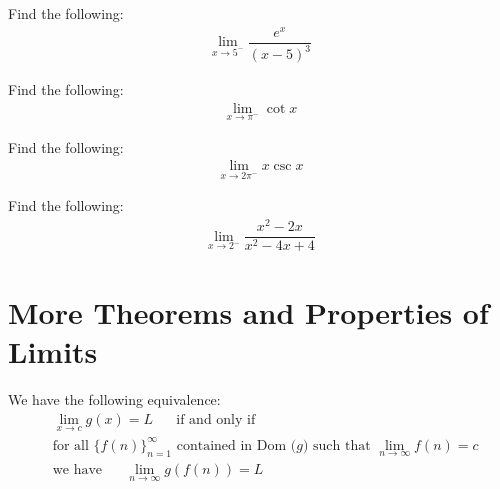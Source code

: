 \begin{exercise}
Find the following:
\begin{align*}
    \lim_{x \longrightarrow 5^{-}} \dfrac{e^{x}}{(x-5)^{3}}
\end{align*}
\end{exercise}

\begin{exercise}
Find the following:
\begin{align*}
    \lim_{x \longrightarrow \pi^{-}} \cot x
\end{align*}
\end{exercise}

\begin{exercise}
Find the following:
\begin{align*}
    \lim_{x \longrightarrow 2\pi^{-}} x\csc x
\end{align*}
\end{exercise}

\begin{exercise}
Find the following:
\begin{align*}
    \lim_{x \longrightarrow 2^{-}} \dfrac{x^{2}-2x}{x^{2}-4x+4}
\end{align*}
\end{exercise}

\newpage
\section{More Theorems and Properties of Limits}

\begin{theorem}
We have the following equivalence:
\begin{align*}
    &\lim_{x \longrightarrow c} g(x) = L \hspace{20pt} \text{if and only if}\\[2ex]
    &\text{for all} \hspace{4pt} \{f(n)\}_{n=1}^{\infty} \hspace{4pt} \text{contained in Dom ($g$) such that} \hspace{4pt} \lim_{n \longrightarrow \infty} f(n)=c\\[2ex]
    &\text{we have} \hspace{20pt} \lim_{n \longrightarrow \infty} g(f(n)) = L
\end{align*}
\label{sequential_criterion_for_limits}
\end{theorem}

